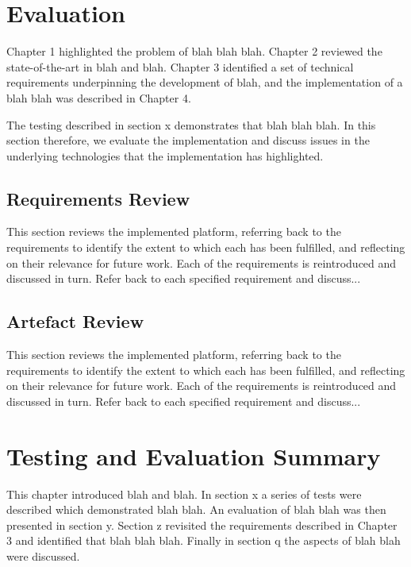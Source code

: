 

\section{Evaluation}

Chapter 1 highlighted the problem of blah blah blah. Chapter 2 reviewed the state-of-the-art in blah and blah.  Chapter 3 identified a set of technical requirements underpinning the development of blah, and the implementation of a blah blah was described in Chapter 4.

The testing described in section x demonstrates that blah blah blah. In this section therefore, we evaluate the implementation and discuss issues in the underlying technologies that the implementation has highlighted.

    \subsection{Requirements Review} \label{s-i--requirements-review}

    This section reviews the implemented platform, referring back to the requirements to identify the extent to which each has been fulfilled, and reflecting on their relevance for future work. Each of the requirements is reintroduced and discussed in turn.
    Refer back to each specified requirement and discuss...


    \subsection{Artefact Review} \label{s-i--artefact-review}

    This section reviews the implemented platform, referring back to the requirements to identify the extent to which each has been fulfilled, and reflecting on their relevance for future work. Each of the requirements is reintroduced and discussed in turn.
    Refer back to each specified requirement and discuss...

\section{Testing and Evaluation Summary}

This chapter introduced blah and blah.  In section x a series of tests were described which demonstrated blah blah.
An evaluation of blah blah was then presented in section y.  Section z revisited the requirements described in Chapter 3 and identified that blah blah blah. Finally in section q the aspects of blah blah were discussed.
